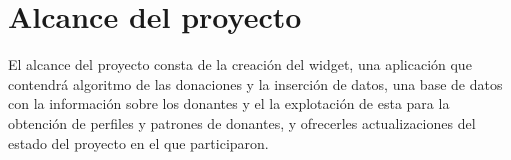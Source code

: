 \documentclass[paper=a4, fontsize=12pt]{scrartcl} %
\numberwithin{equation}{section} %
\numberwithin{figure}{section} %
\numberwithin{table}{section} %
\begin{document}
\section{Alcance del proyecto}
El alcance del proyecto consta de la creación del widget, una aplicación que contendrá algoritmo de las donaciones y la inserción de datos, una base de datos con la información sobre los donantes y el la explotación de esta para la obtención de perfiles y patrones de donantes, y ofrecerles actualizaciones del estado del proyecto en el que participaron. 
\end{document}
